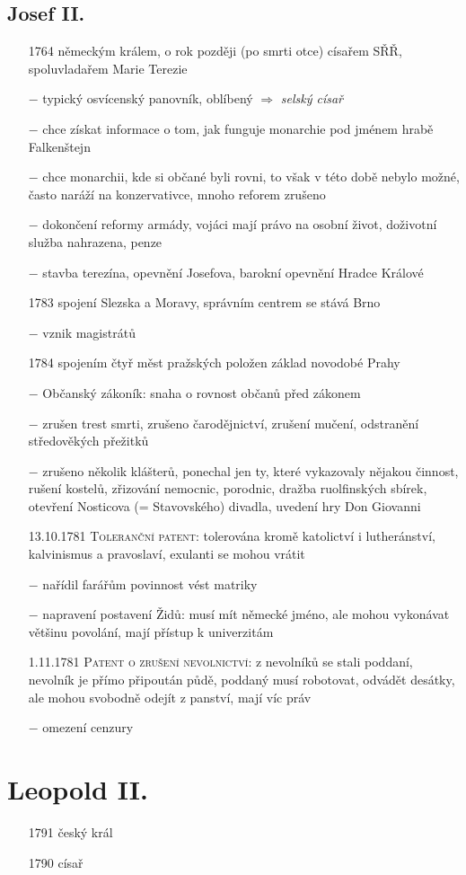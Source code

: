 \documentclass{article}
\begin{document}
\subsection*{Josef II.}
\begin{itemize}
    \vspace{-0.5em}
    \setlength\itemsep{0.15em}
    \item[1764] německým králem, o rok později (po smrti otce) císařem SŘŘ, spoluvladařem Marie Terezie
    \item[$-$] typický osvícenský panovník, oblíbený $\Rightarrow$ \textit{selský císař}
    \item[$-$] chce získat informace o tom, jak funguje monarchie pod jménem hrabě Falkenštejn
    \item[$-$] chce monarchii, kde si občané byli rovni, to však v této době nebylo možné, často naráží na konzervativce, mnoho reforem zrušeno
    \item[$-$] dokončení reformy armády, vojáci mají právo na osobní život, doživotní služba nahrazena, penze
    \item[$-$] stavba terezína, opevnění Josefova, barokní opevnění Hradce Králové
    \item[1783] spojení Slezska a Moravy, správním centrem se stává Brno
    \item[$-$] vznik magistrátů
    \item[1784] spojením čtyř měst pražských položen základ novodobé Prahy
    \item[$-$] Občanský zákoník: snaha o rovnost občanů před zákonem
    \item[$-$] zrušen trest smrti, zrušeno čarodějnictví, zrušení mučení, odstranění středověkých přežitků
    \item[$-$] zrušeno několik klášterů, ponechal jen ty, které vykazovaly nějakou činnost, rušení kostelů, zřizování nemocnic, porodnic, dražba ruolfinských sbírek, otevření Nosticova (= Stavovského) divadla, uvedení hry Don Giovanni
    \item[13.10.1781] \textsc{Toleranční patent}: tolerována kromě katolictví i lutheránství, kalvinismus a pravoslaví, exulanti se mohou vrátit
    \item[$-$] nařídil farářům povinnost vést matriky
    \item[$-$] napravení postavení Židů: musí mít německé jméno, ale mohou vykonávat většinu povolání, mají přístup k univerzitám
    \item[1.11.1781] \textsc{Patent o zrušení nevolnictví}: z nevolníků se stali poddaní, nevolník je přímo připoután půdě, poddaný musí robotovat, odvádět desátky, ale mohou svobodně odejít z panství, mají víc práv
    \item[$-$] omezení cenzury
\end{itemize}


\section*{Leopold II.}
\begin{itemize}
    \vspace{-0.5em}
    \setlength\itemsep{0.15em}
    \item[1791] český král
    \item[1790] císař
\end{itemize}
\end{document}
